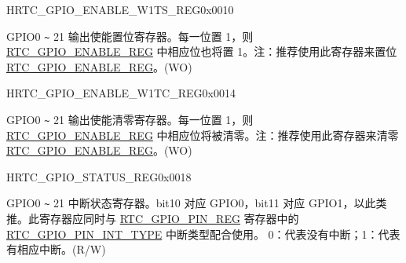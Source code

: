 \begin{register}{H}{RTC\_GPIO\_ENABLE\_W1TS\_REG}{0x{}0010}\label{regdesc:RTCIORTCGPIOENABLEW1TSREG}
%
%
\regnewline%
\begin{regdesc}\begin{reglist}
\label{fielddesc:RTCIOREGRTCIOREGGPIOENABLEW1TS}\item [RTC\_GPIO\_ENABLE\_W1TS] GPIO0 \verb+~+ 21 输出使能置位寄存器。每一位置 1，则 \hyperref[regdesc:RTCIORTCGPIOENABLEREG]{RTC\_GPIO\_ENABLE\_REG} 中相应位也将置 1。注：推荐使用此寄存器来置位 \hyperref[regdesc:RTCIORTCGPIOENABLEREG]{RTC\_GPIO\_ENABLE\_REG}。(WO)
\end{reglist}\end{regdesc}
\end{register}


\begin{register}{H}{RTC\_GPIO\_ENABLE\_W1TC\_REG}{0x{}0014}\label{regdesc:RTCIORTCGPIOENABLEW1TCREG}
%
%
\regnewline%
\begin{regdesc}\begin{reglist}
\label{fielddesc:RTCIOREGRTCIOREGGPIOENABLEW1TC}\item [RTC\_GPIO\_ENABLE\_W1TC] GPIO0 \verb+~+ 21 输出使能清零寄存器。每一位置 1，则 \hyperref[regdesc:RTCIORTCGPIOENABLEREG]{RTC\_GPIO\_ENABLE\_REG} 中相应位将被清零。注：推荐使用此寄存器来清零 \hyperref[regdesc:RTCIORTCGPIOENABLEREG]{RTC\_GPIO\_ENABLE\_REG}。(WO)
\end{reglist}\end{regdesc}
\end{register}


\begin{register}{H}{RTC\_GPIO\_STATUS\_REG}{0x{}0018}\label{regdesc:RTCIORTCGPIOSTATUSREG}
%
%
\regnewline%
\begin{regdesc}\begin{reglist}
\label{fielddesc:RTCIOGPIOSTATUSINT}\item [RTC\_GPIO\_STATUS\_INT] GPIO0 \verb+~+ 21 中断状态寄存器。bit10 对应 GPIO0，bit11 对应 GPIO1，以此类推。此寄存器应同时与 \hyperref[regdesc:RTCIORTCGPIOPINNREG]{RTC\_GPIO\_PIN\_REG} 寄存器中的 \hyperref[fielddesc:RTCIOGPIOPINNINTTYPE]{RTC\_GPIO\_PIN\_INT\_TYPE} 中断类型配合使用。
0：代表没有中断；1：代表有相应中断。(R/W)
\end{reglist}\end{regdesc}
\end{register}



